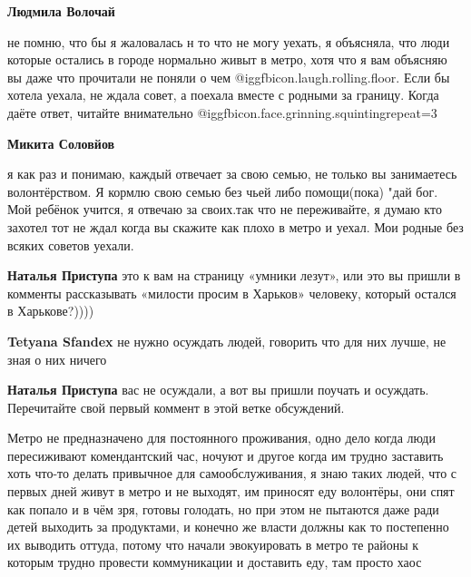 \begin{itemize}
\begin{itemize}
\textbf{Людмила Волочай} 

не помню, что бы я жаловалась н то что не могу уехать, я объясняла, что люди
которые остались в городе нормально живыт в метро, хотя что я вам объясняю вы
даже что прочитали не поняли о чем  @igg{fbicon.laugh.rolling.floor}. Если бы хотела уехала, не ждала совет, а
поехала вместе с родными за границу. Когда даёте ответ, читайте
внимательно @igg{fbicon.face.grinning.squinting}{repeat=3} 

\textbf{Микита Соловйов} 

я как раз и понимаю, каждый отвечает за свою семью, не только вы занимаетесь
волонтёрством. Я кормлю свою семью без чьей либо помощи(пока) "дай бог. Мой
ребёнок учится, я отвечаю за своих.так что не переживайте, я думаю кто захотел
тот не ждал когда вы скажите как плохо в метро и уехал. Мои родные без всяких
советов уехали.

\textbf{Наталья Приступа} это к вам на страницу «умники лезут», или это вы пришли в комменты рассказывать «милости просим в Харьков» человеку, который остался в Харькове?))))

\textbf{Tetyana Sfandex} не нужно осуждать людей, говорить что для них лучше, не зная о них ничего

\textbf{Наталья Приступа} вас не осуждали, а вот вы пришли поучать и осуждать. Перечитайте свой первый коммент в этой ветке обсуждений.


\end{itemize} %


Метро не предназначено для постоянного проживания, одно дело когда люди
пересиживают комендантский час, ночуют и другое когда им трудно заставить хоть
что-то делать привычное для самообслуживания, я знаю таких людей, что с первых
дней живут в метро и не выходят, им приносят еду волонтёры, они спят как попало
и в чём зря, готовы голодать, но при этом не пытаются даже ради детей выходить
за продуктами, и конечно же власти должны как то постепенно их выводить оттуда,
потому что начали эвокуировать в метро те районы к которым трудно провести
коммуникации и доставить еду, там просто хаос



\end{itemize}
